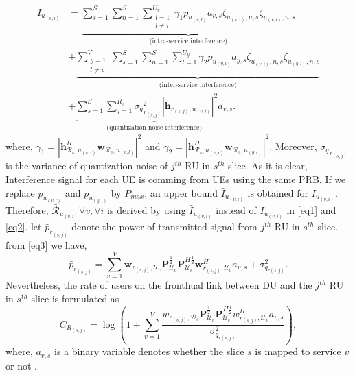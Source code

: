 \documentclass[conference]{IEEEtran}
\begin{document}
\begin{equation}
\begin{split}
 I_{u_{(v,i)}} &=
 \underbrace{\sum_{s=1}^{S}\sum_{n=1}^{S}\sum_{\substack{l=1 \\ l\neq i}}^{{U}_v} \gamma_{1}  p_{u_{(v,l)}}a_{v,s}\zeta_{u_(v,i),n,s}\zeta_{u_(v,l),n,s}}_{\text{(intra-service interference)}}\\
&+ \underbrace{\sum_{\substack{y=1 \\ l\neq v}}^{V}\sum_{s=1}^{S}\sum_{n=1}^{S}\sum_{l=1}^{{U}_y} \gamma_{2}  p_{u_{(y,l)}}a_{y,s} \zeta_{u_(v,i),n,s}\zeta_{u_(y,l),n,s}}_{\text{(inter-service interference)}}\\
&+\underbrace{ \sum_{s=1}^{S} \sum_{j=1}^{{R}_s} {\sigma_q}_{r_{(s,j)}}^2 |\boldsymbol{h}_{r_{(s,j)}, u_{(v,i)}}|^2 a_{v,s}}_{\text{(quantization noise interference)}}.
\end{split}
\end{equation}
where, $\gamma_{1} =|\boldsymbol{h}_{\mathcal{R}_s, u_{(v,i)}}^H \boldsymbol{w}_{\mathcal{R}_{s},u_{(v,l)}}|^2$
and $\gamma_{2} =|\boldsymbol{h}_{\mathcal{R}_s, u_{(v,i)}}^H \boldsymbol{w}_{\mathcal{R}_{s},u_{(y,l)}}|^2$. Moreover,
${\sigma_q}_{r_{(s,j)}}$ is the variance of quantization noise of $j^{th}$ RU in $s^{th}$ slice.
As it is clear, Interference signal for each UE is comming from UEs using the same PRB.
If we replace $p_{u_{(v,l)}}$ and $p_{u_{(y,l)}}$ by $P_{max}$, an upper bound $\bar{I}_{u_{(v,i)}}$ is obtained for $I_{u_{(v,i)}}$. Therefore, $\bar{\mathcal{R}}_{u_{(v,i)}} \forall v , \forall i$ is derived by using $\bar{I}_{u_{(v,i)}}$ instead of $I_{u_{(v,i)}}$ in  \eqref{eq1} and \eqref{eq2}.\newline
let $\bar{p}_{r_{(s,j)}}$ denote the power of transmitted signal from $j^{th}$ RU in $s^{th}$ slice.
from \eqref{eq3} we have,
\begin{equation}
\bar{p}_{r_{(s,j)}} = \sum_{v=1}^{V}\boldsymbol{w}_{r_{(s,j)},\mathcal{U}_{v}} \boldsymbol{P}_{\mathcal{U}_v}^{\frac{1}{2}} \boldsymbol{P}_{\mathcal{U}_v}^{H \frac{1}{2}}   \boldsymbol{w}_{r_{(s,j)},\mathcal{U}_{v}}^H a_{v,s} + \sigma_{q_{r(s,j)}}^2.
\end{equation}
Nevertheless, the rate of users on the fronthual link between DU and the $j^{th}$ RU in $s^{th}$ slice is formulated as \cite{simeone2016cloud, 1111}
\begin{equation}
C_{R_{(s,j)}} = \log{(1+\sum_{v=1}^{V}\frac{w_{r_{(s,j)},\mathcal{D}_{s}} \boldsymbol{P}_{\mathcal{U}_v}^{\frac{1}{2}} \boldsymbol{P}_{\mathcal{U}_v}^{H \frac{1}{2}}   w_{r_{(s,j)},\mathcal{U}_{v}}^H a_{v,s}}{ \sigma_{q_{r(s,j)}}^2})},
\end{equation}
where, $a_{v,s}$ is a binary variable denotes whether the slice $s$ is mapped to service $v$ or not .
\end{document}
